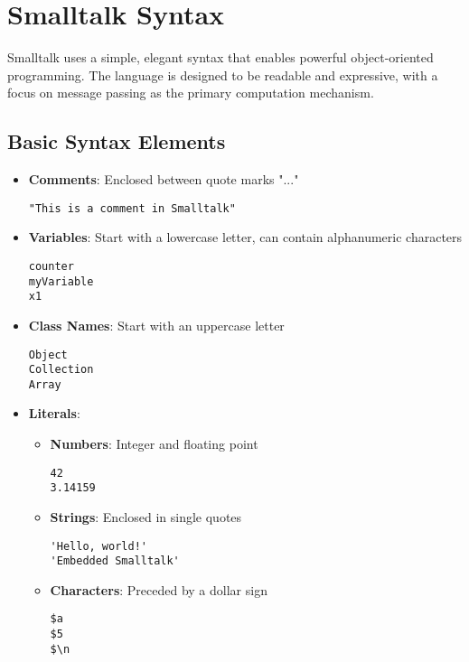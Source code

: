 \documentclass[12pt,a4paper]{report}
\begin{document}
\chapter{Smalltalk Syntax}

Smalltalk uses a simple, elegant syntax that enables powerful object-oriented programming. The language is designed to be readable and expressive, with a focus on message passing as the primary computation mechanism.

\section{Basic Syntax Elements}

\begin{itemize}
    \item \textbf{Comments}: Enclosed between quote marks "..."
    \begin{lstlisting}[style=smalltalk]
"This is a comment in Smalltalk"
\end{lstlisting}

    \item \textbf{Variables}: Start with a lowercase letter, can contain alphanumeric characters
    \begin{lstlisting}[style=smalltalk]
counter
myVariable
x1
\end{lstlisting}

    \item \textbf{Class Names}: Start with an uppercase letter 
    \begin{lstlisting}[style=smalltalk]
Object
Collection
Array
\end{lstlisting}

    \item \textbf{Literals}:
    \begin{itemize}
        \item \textbf{Numbers}: Integer and floating point
        \begin{lstlisting}[style=smalltalk]
42
3.14159
\end{lstlisting}

        \item \textbf{Strings}: Enclosed in single quotes
        \begin{lstlisting}[style=smalltalk]
'Hello, world!'
'Embedded Smalltalk'
\end{lstlisting}

        \item \textbf{Characters}: Preceded by a dollar sign
        \begin{lstlisting}[style=smalltalk]
$a
$5
$\n
\end{lstlisting}


\end{itemize}
\end{itemize}
\end{document}
